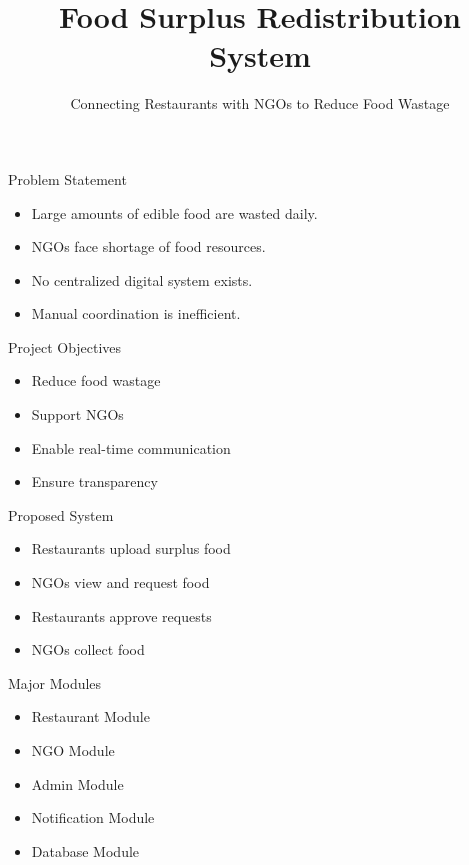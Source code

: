 \documentclass{beamer}
\title{Food Surplus Redistribution System}
\subtitle{Connecting Restaurants with NGOs to Reduce Food Wastage}
\author{}
\date{}
\begin{document}
\begin{frame}
\titlepage
\end{frame}

\begin{frame}{Problem Statement}
\begin{itemize}
\item Large amounts of edible food are wasted daily.
\item NGOs face shortage of food resources.
\item No centralized digital system exists.
\item Manual coordination is inefficient.
\end{itemize}
\end{frame}

\begin{frame}{Project Objectives}
\begin{itemize}
\item Reduce food wastage
\item Support NGOs
\item Enable real-time communication
\item Ensure transparency
\end{itemize}
\end{frame}

\begin{frame}{Proposed System}
\begin{itemize}
\item Restaurants upload surplus food
\item NGOs view and request food
\item Restaurants approve requests
\item NGOs collect food
\end{itemize}
\end{frame}

\begin{frame}{Major Modules}
\begin{itemize}
\item Restaurant Module
\item NGO Module
\item Admin Module
\item Notification Module
\item Database Module
\end{itemize}
\end{frame}
\end{document}
